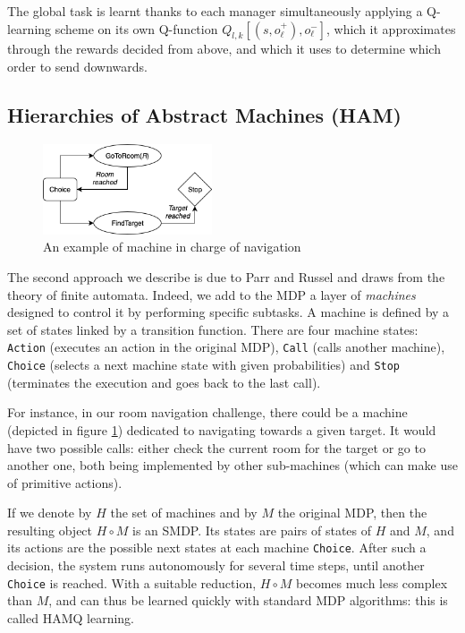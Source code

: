 \documentclass{article}
\begin{document}
The global task is learnt thanks to each manager simultaneously applying a Q-learning scheme on its own Q-function $Q_{l, k}[(s, o_{\ell}^+), o_{\ell}^-]$, which it approximates through the rewards decided from above, and which it uses to determine which order to send downwards.

\subsection{Hierarchies of Abstract Machines (HAM)}

\begin{figure}
\vspace{-1.5cm}
\includegraphics[width=5cm]{images/HAM.png}
\caption{An example of machine in charge of navigation}
\label{fig:HAM}
\end{figure}

The second approach we describe is due to Parr and Russel \cite{parr_reinforcement_1998} and draws from the theory of finite automata. Indeed, we add to the MDP a layer of \emph{machines} designed to control it by performing specific subtasks. A machine is defined by a set of states linked by a transition function. There are four machine states: \texttt{Action} (executes an action in the original MDP), \texttt{Call} (calls another machine), \texttt{Choice} (selects a next machine state with given probabilities) and \texttt{Stop} (terminates the execution and goes back to the last call).

For instance, in our room navigation challenge, there could be a machine (depicted in figure \ref{fig:HAM}) dedicated to navigating towards a given target. It would have two possible calls: either check the current room for the target or go to another one, both being implemented by other sub-machines (which can make use of primitive actions).

If we denote by $H$ the set of machines and by $M$ the original MDP, then the resulting object $H \circ M$ is an SMDP. Its states are pairs of states of $H$ and $M$, and its actions are the possible next states at each machine \texttt{Choice}. After such a decision, the system runs autonomously for several time steps, until another \texttt{Choice} is reached. With a suitable reduction,  $H \circ M$ becomes much less complex than $M$, and can thus be learned quickly with standard MDP algorithms: this is called HAMQ learning.
\end{document}
